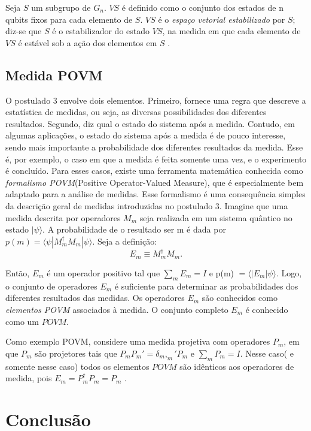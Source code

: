 \documentclass[tcc,capa]{texufpel}
\begin{document}
Seja $S$ um subgrupo de $G_n$. $VS$ é definido como o conjunto dos estados de n qubits fixos para cada elemento de $S$. $VS$ é o \textit{espaço vetorial estabilizado} por $S$; diz-se que $S$ é o estabilizador do estado $VS$, na medida em que cada elemento de $VS$ é estável sob a ação dos elementos em $S$  \cite{chuang00a}.



\section{Medida POVM}
O postulado 3 envolve dois elementos. Primeiro, fornece uma regra que descreve a estatística de medidas, ou seja, as diversas possibilidades dos diferentes resultados. Segundo, diz qual o estado do sistema após a medida. Contudo, em algumas aplicações, o estado do sistema após a medida é de pouco interesse, sendo mais importante a probabilidade dos diferentes resultados da medida. Esse é, por exemplo, o caso em que a medida é feita somente uma vez, e o experimento é concluído. Para esses casos, existe uma ferramenta matemática conhecida como \emph{formalismo POVM}(Positive Operator-Valued Measure), que é especialmente bem adaptado para a análise de medidas. Esse formalismo é uma consequência simples da descrição geral de medidas introduzidas no postulado 3. 
Imagine que uma medida descrita por operadores $M_m$ seja realizada em um sistema quântico no estado $|\psi\rangle$. A probabilidade de o resultado ser m é dada por $p(m) =\langle \psi|M^\dagger _m M_m|\psi\rangle$. Seja a definição: 
\begin{equation}
    E_m\equiv M^\dagger_mM_m.
\end{equation}

Então, $E_m$ é um operador positivo tal que $\sum_m E_m = I$ e p(m) $= \langle|E_m|\psi\rangle$. Logo, o conjunto de operadores $E_m$ é suficiente para determinar as probabilidades dos diferentes resultados das medidas. Os operadores $E_m$ são conhecidos como \emph{elementos POVM} associados à medida. O conjunto completo $E_m$ é conhecido como um $POVM$. 

Como exemplo POVM, considere uma medida projetiva com operadores $P_m$, em que $P_m$ são projetores tais que $P_mP_m' = \delta _m,_m'P_m$ e $\sum_mP_m=I$. Nesse caso( e somente nesse caso) todos os elementos $POVM$ são idênticos aos operadores de medida, pois $E_m \equal P^\dagger_m P_m = P_m$ \cite{chuang00a}.

\chapter{Conclusão}
\end{document}
